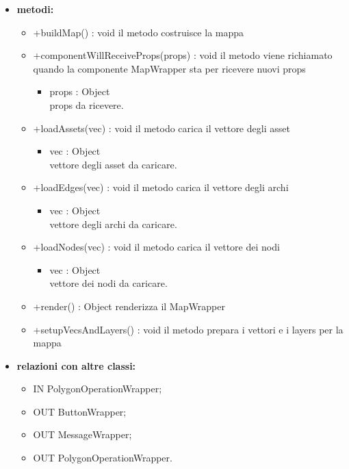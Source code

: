 \begin{itemize}
\begin{itemize}
	\end{itemize}
	\item \textbf{metodi:}
	\begin{itemize}
		\item +buildMap() : void\newline
		il metodo costruisce la mappa
		\item +componentWillReceiveProps(props) : void\newline
		il metodo viene richiamato quando la componente MapWrapper sta per ricevere nuovi props
		\begin{itemize}
			\item props : Object\\
			props da ricevere.
		\end{itemize}
		\item +loadAssets(vec) : void\newline
		il metodo carica il vettore degli asset
		\begin{itemize}
			\item vec : Object\\
			vettore degli asset da caricare.
		\end{itemize}
		\item +loadEdges(vec) : void\newline
		il metodo carica il vettore degli archi
		\begin{itemize}
			\item vec : Object\\
			vettore degli archi da caricare.
		\end{itemize}
		\item +loadNodes(vec) : void\newline
		il metodo carica il vettore dei nodi
		\begin{itemize}
			\item vec : Object\\
			vettore dei nodi da caricare.
		\end{itemize}
		\item +render() : Object\newline
		renderizza il MapWrapper
		\item +setupVecsAndLayers() : void\newline
		il metodo prepara i vettori e i layers per la mappa
	\end{itemize}
	\item \textbf{relazioni con altre classi:} 
	\begin{itemize}
		\item IN PolygonOperationWrapper;
		\item OUT ButtonWrapper;
		\item OUT MessageWrapper;
		\item OUT PolygonOperationWrapper.
	\end{itemize}
\end{itemize}
